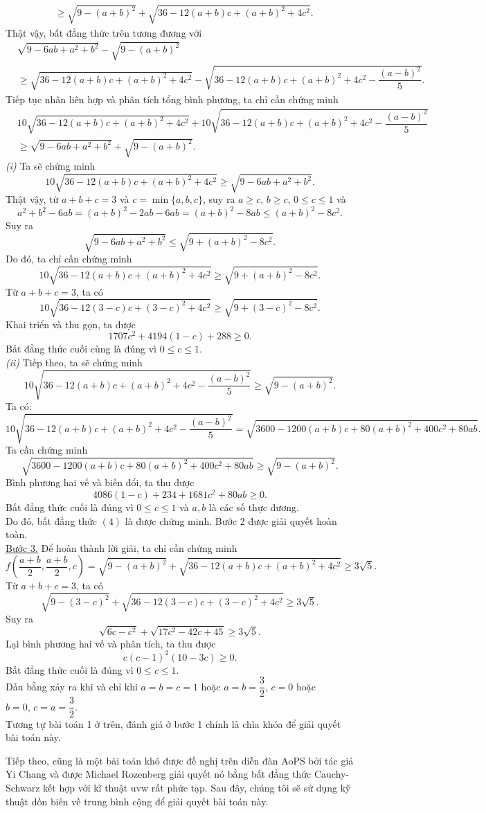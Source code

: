 {\begin{bt}
{\begin{align*}
		& \geq \sqrt{9-(a+b)^2}+\sqrt{36-12(a+b)c+(a+b)^2+4c^2}.
		\end{align*}
		Thật vậy, bất đẳng thức trên tương đương với
		\begin{align*}
		& \sqrt{9-6ab+a^2+b^2}-\sqrt{9-(a+b)^2}\\
		& \geq \sqrt{36-12(a+b)c+(a+b)^2+4c^2}-\sqrt{36-12(a+b)c+(a+b)^2+4c^2-\dfrac{(a-b)^2}{5}}.
		\end{align*}
		Tiếp tục nhân liên hợp và phân tích tổng bình phương, ta chỉ cần chứng minh
		\begin{align}
		& 10\sqrt{36-12(a+b)c+(a+b)^2+4c^2}+10\sqrt{36-12(a+b)c+(a+b)^2+4c^2-\dfrac{(a-b)^2}{5}} \nonumber \\
		& \geq \sqrt{9-6ab+a^2+b^2}+\sqrt{9-(a+b)^2}.\tag{4}
		\end{align}
		\textit{(i)} Ta sẽ chứng minh $$10\sqrt{36-12(a+b)c+(a+b)^2+4c^2}\geq \sqrt{9-6ab+a^2+b^2}.$$
		Thật vậy, từ $a+b+c=3$ và $c=\min\{a,b,c\}$, suy ra $a\geq c,\, b\geq c, \, 0\leq c\leq 1$ và $$a^2+b^2-6ab=(a+b)^2-2ab-6ab=(a+b)^2-8ab\leq (a+b)^2-8c^2.$$
		Suy ra $$\sqrt{9-6ab+a^2+b^2}\leq \sqrt{9+(a+b)^2-8c^2}.$$
		Do đó, ta chỉ cần chứng minh $$10\sqrt{36-12(a+b)c+(a+b)^2+4c^2}\geq \sqrt{9+(a+b)^2-8c^2}.$$
		Từ $a+b+c=3$, ta có $$10\sqrt{36-12(3-c)c+(3-c)^2+4c^2}\geq \sqrt{9+(3-c)^2-8c^2}.$$
		Khai triển và thu gọn, ta được $$1707c^2+4194(1-c)+288\geq 0.$$
		Bất đẳng thức cuối cùng là đúng vì $0\leq c\leq 1$.\\
		\textit{(ii)} Tiếp theo, ta sẽ chứng minh $$10\sqrt{36-12(a+b)c+(a+b)^2+4c^2-\dfrac{(a-b)^2}{5}}\geq \sqrt{9-(a+b)^2}.$$
		Ta có: $$10\sqrt{36-12(a+b)c+(a+b)^2+4c^2-\dfrac{(a-b)^2}{5}}=\sqrt{3600-1200(a+b)c+80(a+b)^2+400c^2+80ab}.$$
		Ta cần chứng minh $$\sqrt{3600-1200(a+b)c+80(a+b)^2+400c^2+80ab}\geq \sqrt{9-(a+b)^2}.$$
		Bình phương hai vế và biến đổi, ta thu được $$4086(1-c)+234+1681c^2+80ab\geq 0.$$
		Bất đẳng thức cuối là đúng vì $0\leq c\leq 1$ và $a,b$ là các số thực dương.\\
		Do đó, bất đẳng thức $(4)$ là được chứng minh. Bước 2 được giải quyết hoàn toàn.\\
		\underline{Bước 3.} Để hoàn thành lời giải, ta chỉ cần chứng minh $$f\left(\dfrac{a+b}{2},\dfrac{a+b}{2},c\right)=\sqrt{9-(a+b)^2}+\sqrt{36-12(a+b)c+(a+b)^2+4c^2}\geq 3\sqrt{5}.$$
		Từ $a+b+c=3$, ta có $$\sqrt{9-(3-c)^2}+\sqrt{36-12(3-c)c+(3-c)^2+4c^2}\geq 3\sqrt{5}.$$
		Suy ra $$\sqrt{6c-c^2}+\sqrt{17c^2-42c+45}\geq 3\sqrt{5}.$$
		Lại bình phương hai vế và phân tích, ta thu được $$c(c-1)^2(10-3c)\geq 0.$$
		Bất đẳng thức cuối là đúng vì $0\leq c\leq 1$.\\
		Dấu bằng xảy ra khi và chỉ khi $a=b=c=1$ hoặc $a=b=\dfrac{3}{2}, \, c=0$ hoặc $b=0, \, c=a=\dfrac{3}{2}.$\\
		Tương tự bài toán 1 ở trên, đánh giá ở bước 1 chính là chìa khóa để giải quyết bài toán này.}
\end{bt}
Tiếp theo, cũng là một bài toán khó được đề nghị trên diễn đàn AoPS bởi tác giả Yi Chang và được Michael Rozenberg giải quyết nó bằng bất đẳng thức Cauchy- Schwarz kết hợp với kĩ thuật uvw rất phức tạp. Sau đây, chúng tôi sẽ sử dụng kỹ thuật dồn biến về trung bình cộng để giải quyết bài toán này.

}
